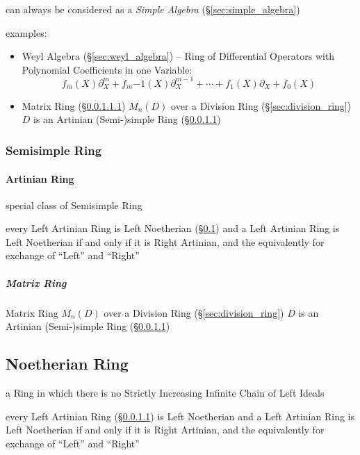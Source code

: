 can always be considered as a \emph{Simple Algebra} (\S\ref{sec:simple_algebra})

examples:
\begin{itemize}
  \item Weyl Algebra (\S\ref{sec:weyl_algebra}) -- Ring of Differential
    Operators with Polynomial Coefficients in one Variable:\[
      f_m(X)\partial^m_X + f_m{-1}(X)\partial^{m-1}_X + \cdots +
      f_1(X)\partial_X + f_0(X)
    \]
  \item Matrix Ring (\S\ref{sec:matrix_ring}) $M_n(D)$ over a Division Ring
    (\S\ref{sec:division_ring}) $D$ is an Artinian (Semi-)simple Ring
    (\S\ref{sec:artinian_ring})
\end{itemize}



\subsubsection{Semisimple Ring}\label{sec:semisimple_ring}

\paragraph{Artinian Ring}\label{sec:artinian_ring}\hfill

special class of Semisimple Ring

every Left Artinian Ring is Left Noetherian (\S\ref{sec:noetherian_ring}) and a
Left Artinian Ring is Left Noetherian if and only if it is Right Artinian, and
the equivalently for exchange of ``Left'' and ``Right''



\subparagraph{Matrix Ring}\label{sec:matrix_ring}\hfill

Matrix Ring $M_n(D)$ over a Division Ring (\S\ref{sec:division_ring}) $D$ is an
Artinian (Semi-)simple Ring (\S\ref{sec:artinian_ring})



\subsection{Noetherian Ring}\label{sec:noetherian_ring}

a Ring in which there is no Strictly Increasing Infinite Chain of Left Ideals

every Left Artinian Ring (\S\ref{sec:artinian_ring}) is Left Noetherian and a
Left Artinian Ring is Left Noetherian if and only if it is Right Artinian, and
the equivalently for exchange of ``Left'' and ``Right''

